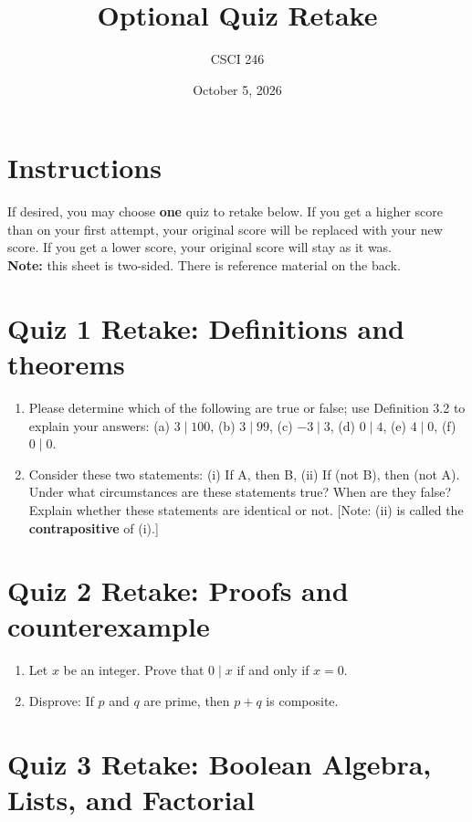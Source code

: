 \documentclass[11pt]{article}
\title{Optional Quiz Retake}
\author{CSCI 246}
\date{October 5, 2026}
\begin{document}
\maketitle


\section*{Instructions}
If desired, you may choose \textbf{one} quiz to retake below. If you get a higher score than on your first attempt, your original score will be replaced with your new score.  If you get a lower score, your original score will stay as it was.  \\

\noindent \textbf{Note:} this sheet is two-sided. There is reference material on the back.

\section*{Quiz 1 Retake: Definitions and theorems}

\begin{enumerate}
\item Please determine which of the following are true or false; use Definition 3.2 to explain your answers: (a) $3 \mid 100$, (b) $3 \mid 99$, (c) $-3 \mid 3$, (d) $0 \mid 4$, (e) $4 \mid 0$, (f) $0 \mid 0$.
\item Consider these two statements: (i) If A, then B, (ii) If (not B), then (not A). Under what circumstances are these statements true? When are they false? Explain whether these statements are identical or not. [Note: (ii) is called the \textbf{contrapositive} of (i).]
\end{enumerate}

\section*{Quiz 2 Retake: Proofs and counterexample}

\begin{enumerate}
\item Let $x$ be an integer. Prove that $0 \mid x$ if and only if $x=0$.
\item Disprove: If $p$ and $q$ are prime, then $p+q$ is composite.
\end{enumerate}

\section*{Quiz 3 Retake: Boolean Algebra, Lists, and Factorial}
\end{document}
